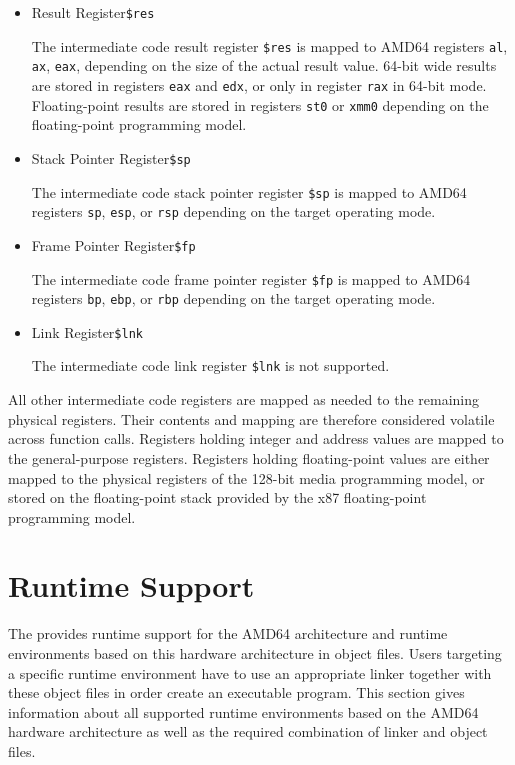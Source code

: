 \begin{itemize}

\item Result Register\alignright\texttt{\$res}\nopagebreak

The intermediate code result register \texttt{\$res} is mapped to AMD64 registers \texttt{al}, \texttt{ax}, \texttt{eax}, depending on the size of the actual result value.
64-bit wide results are stored in registers \texttt{eax} and \texttt{edx}, or only in register \texttt{rax} in 64-bit mode.
Floating-point results are stored in registers \texttt{st0} or \texttt{xmm0} depending on the floating-point programming model.

\item Stack Pointer Register\alignright\texttt{\$sp}\nopagebreak

The intermediate code stack pointer register \texttt{\$sp} is mapped to AMD64 registers \texttt{sp}, \texttt{esp},
or \texttt{rsp} depending on the target operating mode.

\item Frame Pointer Register\alignright\texttt{\$fp}\nopagebreak

The intermediate code frame pointer register \texttt{\$fp} is mapped to AMD64 registers \texttt{bp}, \texttt{ebp},
or \texttt{rbp} depending on the target operating mode.

\item Link Register\alignright\texttt{\$lnk}\nopagebreak

The intermediate code link register \texttt{\$lnk} is not supported.

\end{itemize}

All other intermediate code registers are mapped as needed to the remaining physical registers.
Their contents and mapping are therefore considered volatile across function calls.
Registers holding integer and address values are mapped to the general-purpose registers.
Registers holding floating-point values are either mapped to the physical registers of the 128-bit media programming model,
or stored on the floating-point stack provided by the x87 floating-point programming model.

\section{Runtime Support}

The \ecs{} provides runtime support for the AMD64 architecture and runtime environments based on this hardware architecture in object files.
Users targeting a specific runtime environment have to use an appropriate linker together with these object files in order create an executable program.
This section gives information about all supported runtime environments based on the AMD64 hardware architecture as well as the required combination of linker and object files.

